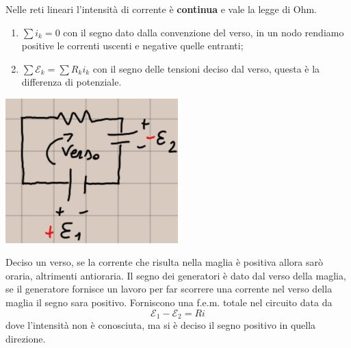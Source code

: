 \documentclass[a4paper, 12pt]{book}
\theoremstyle{plain}
\begin{document}
Nelle reti lineari l'intensità di corrente è \textbf{continua} e vale la legge di Ohm.
\begin{enumerate}
    \item $\sum i_k = 0$ con il segno dato dalla convenzione del verso, in un nodo rendiamo positive le correnti uscenti e negative quelle entranti;
    \item $\sum \mathcal{E}_k = \sum R_k i_k $ con il segno delle tensioni deciso dal verso, questa è la differenza di potenziale.
\end{enumerate}
\begin{center}
    \includegraphics[width=0.5\textwidth]{segno.jpg}
\end{center}
Deciso un verso, se la corrente che risulta nella maglia è 
positiva allora sarò oraria, altrimenti antioraria. Il 
segno dei generatori è dato dal verso della maglia, se il 
generatore fornisce un lavoro per far scorrere una corrente 
nel verso della maglia il segno sara positivo. Forniscono 
una f.e.m. totale nel circuito data da \[ \mathcal{E}_1 - \mathcal{E}_2 = Ri \]
dove l'intensità non è conosciuta, ma si è deciso il segno positivo 
in quella direzione.
\end{document}
